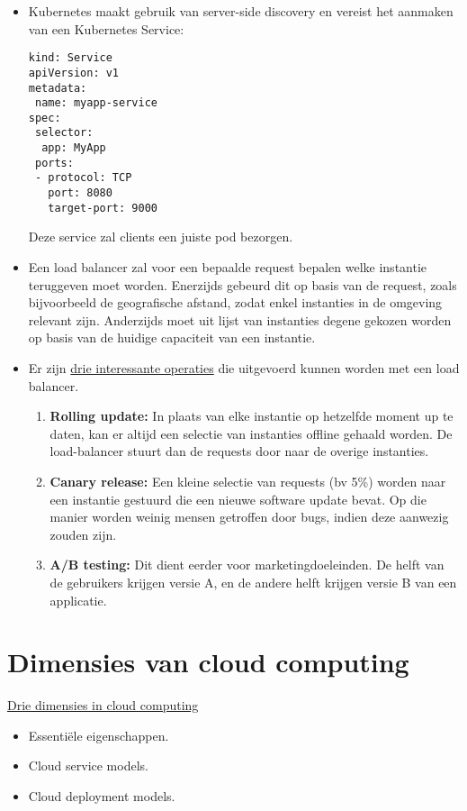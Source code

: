 \begin{itemize}
		\item[\info] Kubernetes maakt gebruik van server-side discovery en vereist het aanmaken van een Kubernetes Service:
		\begin{lstlisting}
kind: Service
apiVersion: v1
metadata:
 name: myapp-service
spec:
 selector:
  app: MyApp
 ports:
 - protocol: TCP
   port: 8080
   target-port: 9000
		\end{lstlisting}
		Deze service zal clients een juiste pod bezorgen. 
	
		\item[\info] Een load balancer zal voor een bepaalde request bepalen welke instantie teruggeven moet worden. Enerzijds gebeurd dit op basis van de request, zoals bijvoorbeeld de geografische afstand, zodat enkel instanties in de omgeving relevant zijn. Anderzijds moet uit lijst van instanties degene gekozen worden op basis van de huidige capaciteit van een instantie.

		\item[\info] Er zijn \underline{drie interessante operaties} die uitgevoerd kunnen worden met een load balancer.
		\begin{enumerate}
			\item[\info]\textbf{Rolling update:} In plaats van elke instantie op hetzelfde moment up te daten, kan er altijd een selectie van instanties offline gehaald worden. De load-balancer stuurt dan de requests door naar de overige instanties.
			\item[\info]\textbf{Canary release:} Een kleine selectie van requests (bv 5\%) worden naar een instantie gestuurd die een nieuwe software update bevat. Op die manier worden weinig mensen getroffen door bugs, indien deze aanwezig zouden zijn.  
			\item[\info]\textbf{A/B testing:} Dit dient eerder voor marketingdoeleinden. De helft van de gebruikers krijgen versie A, en de andere helft krijgen versie B van een applicatie.
		\end{enumerate}
	\end{itemize}

	\section{Dimensies van cloud computing}
	\underline{Drie dimensies in cloud computing}
	\begin{itemize}
		\item[\info] Essentiële eigenschappen.
		\item[\info] Cloud service models.
		\item[\info] Cloud deployment models.
	\end{itemize}

